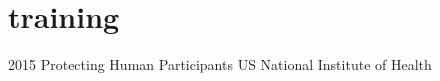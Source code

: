 \documentclass[]{cv-style}          %
\begin{document}

\section{training}

\begin{entrylist}
\entry
{2015}
{Protecting Human Participants}
{US National Institute of Health}
{}
\end{entrylist}




\end{document}
